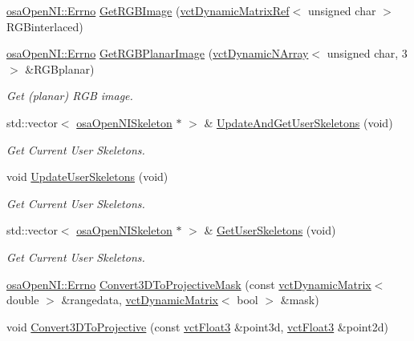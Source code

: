 \begin{DoxyCompactItemize}
\hyperlink{classosa_open_n_i_a9f02bd17e25b1ee362b08c5620e307db}{osa\+Open\+N\+I\+::\+Errno} \hyperlink{classosa_open_n_i_a5c1ebc9bd4ef31036977a3d52f28a6b0}{Get\+R\+G\+B\+Image} (\hyperlink{classvct_dynamic_matrix_ref}{vct\+Dynamic\+Matrix\+Ref}$<$ unsigned char $>$ R\+G\+Binterlaced)
\item 
\hyperlink{classosa_open_n_i_a9f02bd17e25b1ee362b08c5620e307db}{osa\+Open\+N\+I\+::\+Errno} \hyperlink{classosa_open_n_i_a84cc1d888935ed0e86ec641bee5dbed3}{Get\+R\+G\+B\+Planar\+Image} (\hyperlink{classvct_dynamic_n_array}{vct\+Dynamic\+N\+Array}$<$ unsigned char, 3 $>$ \&R\+G\+Bplanar)
\begin{DoxyCompactList}\small\item\em Get (planar) R\+G\+B image. \end{DoxyCompactList}\item 
std\+::vector$<$ \hyperlink{classosa_open_n_i_skeleton}{osa\+Open\+N\+I\+Skeleton} $\ast$ $>$ \& \hyperlink{classosa_open_n_i_a64c73d43cf0a9bf170202b646d0f0a2d}{Update\+And\+Get\+User\+Skeletons} (void)
\begin{DoxyCompactList}\small\item\em Get Current User Skeletons. \end{DoxyCompactList}\item 
void \hyperlink{classosa_open_n_i_a8761014f742fc2ea4f33ab09ddeaef12}{Update\+User\+Skeletons} (void)
\begin{DoxyCompactList}\small\item\em Get Current User Skeletons. \end{DoxyCompactList}\item 
std\+::vector$<$ \hyperlink{classosa_open_n_i_skeleton}{osa\+Open\+N\+I\+Skeleton} $\ast$ $>$ \& \hyperlink{classosa_open_n_i_a8ce7951108d4eec1cace5cc085bc6ca1}{Get\+User\+Skeletons} (void)
\begin{DoxyCompactList}\small\item\em Get Current User Skeletons. \end{DoxyCompactList}\item 
\hyperlink{classosa_open_n_i_a9f02bd17e25b1ee362b08c5620e307db}{osa\+Open\+N\+I\+::\+Errno} \hyperlink{classosa_open_n_i_a06e08af7772db71878b28b78b8797126}{Convert3\+D\+To\+Projective\+Mask} (const \hyperlink{classvct_dynamic_matrix}{vct\+Dynamic\+Matrix}$<$ double $>$ \&rangedata, \hyperlink{classvct_dynamic_matrix}{vct\+Dynamic\+Matrix}$<$ bool $>$ \&mask)
\item 
void \hyperlink{classosa_open_n_i_a0fb31dbfe77cacd786bdb19adc6d7208}{Convert3\+D\+To\+Projective} (const \hyperlink{vct_fixed_size_vector_types_8h_a86116f095b661a1ffb5f630c06ee258d}{vct\+Float3} \&point3d, \hyperlink{vct_fixed_size_vector_types_8h_a86116f095b661a1ffb5f630c06ee258d}{vct\+Float3} \&point2d)
\end{DoxyCompactItemize}
